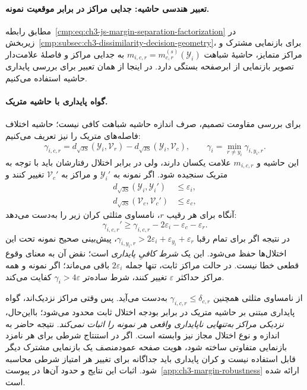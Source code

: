 \paragraph{تعبیر هندسی حاشیه: جدایی مراکز در برابر موقعیت نمونه.}
مطابق رابطه~\eqref{cmp:eq:ch3-js-margin-separation-factorization}
در زیربخش~\ref{cmp:subsec:ch3-dissimilarity-decision-geometry}،
برای بازنمایی مشترک و مراکز متمایز، حاشیهٔ
شباهت $m_{i,c,r}=m_{c,r}^{(s)}(\mathscr Y_i)$
به جدایی مراکز و فاصلهٔ علامت‌دار تصویر
بازنمایی از ابرصفحه بستگی دارد.
در اینجا از همان تعبیر برای بررسی پایداری
حاشیه استفاده می‌کنیم.

\paragraph{گواه پایداری با حاشیه متریک.}
برای بررسی مقاومت تصمیم، صرف اندازه
حاشیه شباهت کافی نیست؛ حاشیه اختلاف
فاصله‌های متریک را نیز تعریف می‌کنیم:
\begin{equation}\label{cmp:eq:ch3-metric-robust-margin}
\boxed{
\gamma_{i,c,r}
=d_{\sqrt{\mathrm{JS}}}(\mathscr Y_i,\mathcal V_r)
-d_{\sqrt{\mathrm{JS}}}(\mathscr Y_i,\mathcal V_c),
\qquad
\gamma_i=\min_{r\ne y_i}\gamma_{i,y_i,r}.
}
\end{equation}
این حاشیه و $m_{i,c,r}$ علامت
یکسان دارند، ولی در برابر اختلال
رفتارشان باید با توجه به متریک سنجیده شود.
اگر نمونه به $\mathscr Y_i'$ و مراکز
به $\mathcal V_c'$ تغییر کنند و
\[
\begin{aligned}
d_{\sqrt{\mathrm{JS}}}(\mathscr Y_i,\mathscr Y_i')&\le\varepsilon_i,\\
d_{\sqrt{\mathrm{JS}}}(\mathcal V_c,\mathcal V_c')&\le\varepsilon_c,
\end{aligned}
\]
آنگاه برای هر رقیب $r$، نامساوی مثلثی
کران زیر را به‌دست می‌دهد:
\begin{equation}\label{cmp:eq:ch3-margin-perturbation-bound}
\boxed{
\gamma_{i,c,r}'
\ge \gamma_{i,c,r}
-2\varepsilon_i-\varepsilon_c-\varepsilon_r.
}
\end{equation}
در نتیجه اگر برای تمام رقبا
$\gamma_{i,y_i,r}>
2\varepsilon_i+\varepsilon_{y_i}+\varepsilon_r$،
پیش‌بینی صحیح نمونه تحت این
اختلال‌ها حفظ می‌شود.
این یک \emph{شرط کافیِ پایداری} است؛
نقض آن به معنای وقوع قطعی خطا نیست.
در حالت مراکز ثابت، تنها جمله
$2\varepsilon_i$ باقی می‌ماند؛
اگر نمونه و همه مراکز حداکثر
$\varepsilon$ تغییر کنند،
شرط ساده‌تر $\gamma_i>4\varepsilon$
کفایت می‌کند.

از نامساوی مثلثی همچنین
$\gamma_{i,c,r}\le\delta_{c,r}$
به‌دست می‌آید. پس وقتی مراکز نزدیک‌اند،
گواه پایداری مبتنی بر حاشیه متریک
در برابر بودجه اختلال ثابت
محدود می‌شود؛ بااین‌حال،
\emph{نزدیکی مراکز به‌تنهایی ناپایداری
واقعی هر نمونه را اثبات نمی‌کند}.
نتیجه حاضر به اندازه و نوع
اختلال مجاز نیز وابسته است.
اگر در استنتاج شرطی برای
هر نامزد بازنمایی متفاوتی ساخته شود،
هویت صفحه عمودمنصف یک بازنمایی مشترک
دیگر قابل استفاده نیست و کران پایداری
باید جداگانه برای تغییر هر امتیاز
شرطی محاسبه شود.
اثبات این نتایج و حدود آن‌ها در
پیوست~\ref{app:ch3-margin-robustness}
ارائه شده است.


